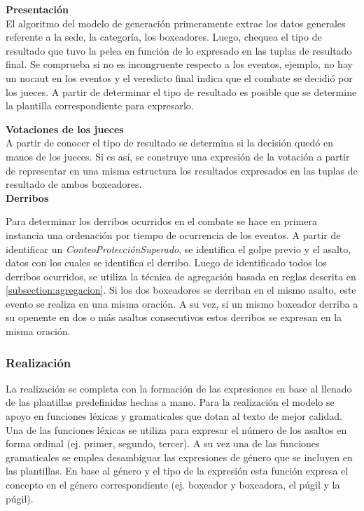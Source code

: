     \textbf{Presentación}\\

    El algoritmo del modelo de generación primeramente extrae los datos generales referente a la sede, la categoría, los 
boxeadores. Luego, chequea el tipo de resultado que tuvo la pelea en función de lo expresado en las tuplas de resultado final.
Se comprueba si no es incongruente respecto a los eventos, ejemplo, no hay un nocaut en los eventos y el veredicto final indica que el 
combate se decidió por los jueces. A partir de determinar el tipo de resultado es posible que se determine la plantilla correspondiente para 
expresarlo.

    \textbf{Votaciones de los jueces}\\

    A partir de conocer el tipo de resultado se determina si la decisión quedó en manos de los jueces. Si es así, se construye una expresión 
de la votación a partir de representar en una misma estructura los resultados expresados en las tuplas de resultado de 
ambos boxeadores.\\

    \textbf{Derribos}

    Para determinar los derribos ocurridos en el combate se hace en primera instancia una ordenación por tiempo de 
ocurrencia de los eventos. A partir de identificar un \textit{ConteoProtecciónSuperado}, se identifica el golpe previo y el asalto, 
datos con los cuales se identifica el derribo. Luego de identificado todos los derribos ocurridos, se utiliza la técnica de agregación 
basada en reglas descrita en \ref{subsection:agregacion}. Si los dos boxeadores se derriban en el mismo asalto, este evento se realiza en 
una misma oración. A su vez, si un mismo boxeador derriba a su openente en dos o más asaltos consecutivos estos derribos se expresan en la misma 
oración.


\subsubsection{Realización}

    La realización se completa con la formación de las expresiones en base al llenado de las plantillas predefinidas hechas a mano. Para la 
realización el modelo se apoyo en funciones léxicas y gramaticales que dotan al texto de mejor calidad. Una de las funciones léxicas se utiliza 
para expresar el número de los asaltos en forma ordinal (ej. primer, segundo, tercer). A su vez una de las funciones gramaticales se emplea 
desambiguar las expresiones de género que se incluyen en las plantillas. En base al género y el tipo de la expresión esta función expresa el concepto 
en el género correspondiente (ej. boxeador y boxeadora, el púgil y la púgil). 

